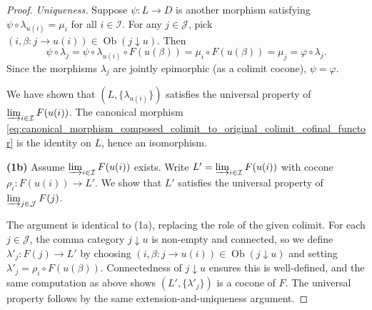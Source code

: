\begin{proof}
\textit{Uniqueness.} Suppose $\psi : L \to D$ is another morphism satisfying $\psi \circ \lambda_{u(i)} = \mu_i$ for all $i \in \mathcal{I}$. For any $j \in \mathcal{J}$, pick $(i,\beta : j \to u(i)) \in \operatorname{Ob}(j \downarrow u)$. Then
$$\psi \circ \lambda_j = \psi \circ \lambda_{u(i)} \circ F(u(\beta)) = \mu_i \circ F(u(\beta)) = \mu_j = \varphi \circ \lambda_j.$$
Since the morphisms $\lambda_j$ are jointly epimorphic (as a colimit cocone), $\psi = \varphi$.

We have shown that $(L, \{\lambda_{u(i)}\})$ satisfies the universal property of $\varinjlim_{i \in \mathcal{I}} F(u(i))$. The canonical morphism \eqref{eq:canonical_morphism_composed_colimit_to_original_colimit_cofinal_functor} is the identity on $L$, hence an isomorphism.

\textbf{(1b)} Assume $\varinjlim_{i \in \mathcal{I}} F(u(i))$ exists. Write $L' = \varinjlim_{i \in \mathcal{I}} F(u(i))$ with cocone $\rho_i : F(u(i)) \to L'$. We show that $L'$ satisfies the universal property of $\varinjlim_{j \in \mathcal{J}} F(j)$.

The argument is identical to (1a), replacing the role of the given colimit. For each $j \in \mathcal{J}$, the comma category $j \downarrow u$ is non-empty and connected, so we define $\lambda'_j : F(j) \to L'$ by choosing $(i,\beta : j \to u(i)) \in \operatorname{Ob}(j \downarrow u)$ and setting $\lambda'_j = \rho_i \circ F(u(\beta))$. Connectedness of $j \downarrow u$ ensures this is well-defined, and the same computation as above shows $(L', \{\lambda'_j\})$ is a cocone of $F$. The universal property follows by the same extension-and-uniqueness argument.
\end{proof}
